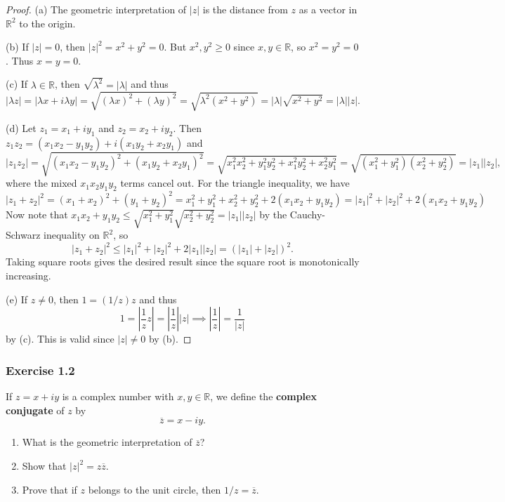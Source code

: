 \documentclass[letterpaper, 12pt]{article}
\newcommand{\R}{\mathbb{R}}
\begin{document}
\begin{proof}
  (a) The geometric interpretation of $|z|$ is the
  distance from $z$ as a vector in $\R^2$ to the origin.

  (b) If $|z| = 0$, then
  $|z|^2 = x^2 + y^2 = 0$.
  But $x^2, y^2 \ge 0$ since $x, y \in \R$, so
  $x^2 = y^2 = 0$. Thus $x = y = 0$.

  (c) If $\lambda \in \R$, then
  $\sqrt{\lambda^2} = |\lambda|$ and thus
  \[
    |\lambda z|
    = |\lambda x + i \lambda y|
    = \sqrt{(\lambda x)^2 + (\lambda y)^2}
    = \sqrt{\lambda^2 (x^2 + y^2)}
    = |\lambda| \sqrt{x^2 + y^2}
    = |\lambda| |z|.
  \]

  (d) Let $z_1 = x_1 + i y_1$ and $z_2 = x_2 + i y_2$.
  Then
  $z_1 z_2 = (x_1 x_2 - y_1 y_2) + i (x_1 y_2 + x_2 y_1)$
  and
  \[
    |z_1 z_2|
    = \sqrt{(x_1 x_2 - y_1 y_2)^2 + (x_1 y_2 + x_2 y_1)^2}
    = \sqrt{x_1^2 x_2^2 + y_1^2 y_2^2 + x_1^2 y_2^2 + x_2^2 y_1^2}
    = \sqrt{(x_1^2 + y_1^2)(x_2^2 + y_2^2)}
    = |z_1| |z_2|,
  \]
  where the mixed $x_1x_2y_1y_2$ terms cancel out.
  For the triangle inequality, we have
  \[
    |z_1 + z_2|^2
    = (x_1 + x_2)^2 + (y_1 + y_2)^2
    = x_1^2 + y_1^2 + x_2^2 + y_2^2 + 2(x_1 x_2 + y_1 y_2)
    = |z_1|^2 + |z_2|^2 + 2(x_1x_2 + y_1y_2)
  \]
  Now note that
  $x_1x_2 + y_1y_2 \le \sqrt{x_1^2 + y_1^2} \sqrt{x_2^2 + y_2^2} = |z_1| |z_2|$
  by the Cauchy-Schwarz inequality on $\R^2$, so
  \[
    |z_1 + z_2|^2
    \le |z_1|^2 + |z_2|^2 + 2|z_1| |z_2|
    = (|z_1| + |z_2|)^2.
  \]
  Taking square roots gives the desired result
  since the square root is monotonically increasing.

  (e) If $z \ne 0$, then $1 = (1 / z) z$ and thus
  \[
    1 = \left| \frac{1}{z} z \right|
    = \left| \frac{1}{z} \right| |z|
    \implies \left| \frac{1}{z} \right| = \frac{1}{|z|}
  \]
  by (c). This is valid since $|z| \ne 0$ by (b).
\end{proof}

\subsubsection{Exercise 1.2}
\begin{tcolorbox}
  If $z = x + iy$ is a complex number with $x, y \in \R$,
  we define the \textbf{complex conjugate} of $z$ by
  \[\overline{z} = x - iy.\]
  \begin{enumerate}
    \item What is the geometric interpretation
      of $\overline{z}$?
    \item Show that $|z|^2 = z \overline{z}$.
    \item Prove that if $z$ belongs to the unit circle,
      then $1 / z = \overline{z}$.
  \end{enumerate}
\end{tcolorbox}
\end{document}
